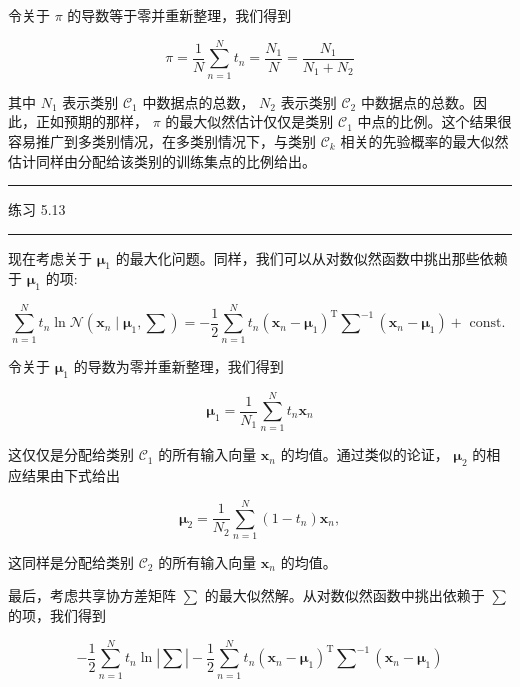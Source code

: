 \documentclass[10pt]{report}
\newcommand{\HRule}{\begin{center}\rule{0.9\linewidth}{0.2mm}\end{center}}
\begin{document}
令关于 \(\pi\) 的导数等于零并重新整理，我们得到

\[
\pi  = \frac{1}{N}\mathop{\sum }\limits_{{n = 1}}^{N}{t}_{n} = \frac{{N}_{1}}{N} = \frac{{N}_{1}}{{N}_{1} + {N}_{2}} \tag{5.56}
\]

其中 \({N}_{1}\) 表示类别 \({\mathcal{C}}_{1}\) 中数据点的总数， \({N}_{2}\) 表示类别 \({\mathcal{C}}_{2}\) 中数据点的总数。因此，正如预期的那样， \(\pi\) 的最大似然估计仅仅是类别 \({\mathcal{C}}_{1}\) 中点的比例。这个结果很容易推广到多类别情况，在多类别情况下，与类别 \({\mathcal{C}}_{k}\) 相关的先验概率的最大似然估计同样由分配给该类别的训练集点的比例给出。

\HRule

练习 5.13

\HRule

现在考虑关于 \({\mathbf{\mu }}_{1}\) 的最大化问题。同样，我们可以从对数似然函数中挑出那些依赖于 \({\mathbf{\mu }}_{1}\) 的项:

\[
\mathop{\sum }\limits_{{n = 1}}^{N}{t}_{n}\ln \mathcal{N}\left( {{\mathbf{x}}_{n} \mid  {\mathbf{\mu }}_{1},\mathbf{\sum }}\right)  =  - \frac{1}{2}\mathop{\sum }\limits_{{n = 1}}^{N}{t}_{n}{\left( {\mathbf{x}}_{n} - {\mathbf{\mu }}_{1}\right) }^{\mathrm{T}}{\mathbf{\sum }}^{-1}\left( {{\mathbf{x}}_{n} - {\mathbf{\mu }}_{1}}\right)  + \text{ const. } \tag{5.57}
\]

令关于 \({\mathbf{\mu }}_{1}\) 的导数为零并重新整理，我们得到

\[
{\mathbf{\mu }}_{1} = \frac{1}{{N}_{1}}\mathop{\sum }\limits_{{n = 1}}^{N}{t}_{n}{\mathbf{x}}_{n} \tag{5.58}
\]

这仅仅是分配给类别 \({\mathcal{C}}_{1}\) 的所有输入向量 \({\mathbf{x}}_{n}\) 的均值。通过类似的论证， \({\mathbf{\mu }}_{2}\) 的相应结果由下式给出

\[
{\mathbf{\mu }}_{2} = \frac{1}{{N}_{2}}\mathop{\sum }\limits_{{n = 1}}^{N}\left( {1 - {t}_{n}}\right) {\mathbf{x}}_{n}, \tag{5.59}
\]

这同样是分配给类别 \({\mathcal{C}}_{2}\) 的所有输入向量 \({\mathbf{x}}_{n}\) 的均值。

最后，考虑共享协方差矩阵 \(\sum\) 的最大似然解。从对数似然函数中挑出依赖于 \(\sum\) 的项，我们得到

\[
- \frac{1}{2}\mathop{\sum }\limits_{{n = 1}}^{N}{t}_{n}\ln \left| \mathbf{\sum }\right|  - \frac{1}{2}\mathop{\sum }\limits_{{n = 1}}^{N}{t}_{n}{\left( {\mathbf{x}}_{n} - {\mathbf{\mu }}_{1}\right) }^{\mathrm{T}}{\mathbf{\sum }}^{-1}\left( {{\mathbf{x}}_{n} - {\mathbf{\mu }}_{1}}\right)
\]
\end{document}
